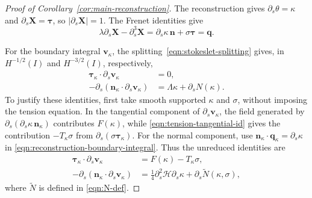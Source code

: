\documentclass[11pt,reqno]{amsart}
\theoremstyle{plain}
\theoremstyle{definition}
\numberwithin{equation}{section}
\newcommand{\paren}[1]{\left(#1\right)}
\newcommand{\p}{\partial}
\newcommand{\mc}[1]{\mathcal{#1}}
\newcommand{\wt}[1]{\widetilde{#1}}
\newcommand{\bm}[1]{\boldsymbol{#1}}
\newcommand{\abs}[1]{\left\lvert #1 \right\rvert}
\newcommand{\tk}{\bm\tau_\kappa}
\newcommand{\nk}{\bm n_\kappa}
\begin{document}
\begin{proof}[Proof of Corollary~\ref{cor:main-reconstruction}]
The reconstruction gives $\p_s\theta=\kappa$ and
$\p_s\bm X=\bm\tau$, so $\abs{\p_s\bm X}=1$.
The Frenet identities give
\begin{equation}\label{eqn:reconstructed-force}
    \lambda\p_s\bm X-\p_s^3\bm X
    =\p_s\kappa\,\bm n+\sigma\bm\tau
    =\bm q.
\end{equation}

For the boundary integral $\bm v_\kappa$, the splitting~\eqref{eqn:stokeslet-splitting} gives, in
$H^{-1/2}(I)$ and $H^{-3/2}(I)$, respectively,
\begin{subequations}\label{eqn:reduced-velocity}
\begin{align}
    \tk\cdot\p_s\bm v_\kappa&=0,
        \label{eqn:reduced-velocity-tan}\\
    -\p_s\paren{\nk\cdot\p_s\bm v_\kappa}
        &=\Lambda\kappa+\p_sN(\kappa).
        \label{eqn:reduced-velocity-normal}
\end{align}
\end{subequations}
To justify these identities, first take smooth supported $\kappa$ and
$\sigma$, without imposing the tension equation. In the tangential
component of $\p_s\bm v_\kappa$, the field generated by
$\p_s(\p_s\kappa\,\nk)$ contributes $F(\kappa)$, while
\eqref{eqn:tension-tangential-id} gives the contribution
$-T_\kappa\sigma$ from $\p_s(\sigma\tk)$. For the normal component, use
$\nk\cdot\bm q_\kappa=\p_s\kappa$ in
\eqref{eqn:reconstruction-boundary-integral}. Thus the unreduced
identities are
\begin{equation}\label{eqn:unreduced-velocity-identities}
\begin{aligned}
    \tk\cdot\p_s\bm v_\kappa
    &=F(\kappa)-T_\kappa\sigma,\\
    -\p_s\paren{\nk\cdot\p_s\bm v_\kappa}
    &=\frac14\p_s^2\mc H\p_s\kappa
        +\p_s\wt N(\kappa,\sigma),
\end{aligned}
\end{equation}
where $\wt N$ is defined in \eqref{eqn:N-def}.


\end{proof}
\end{document}
